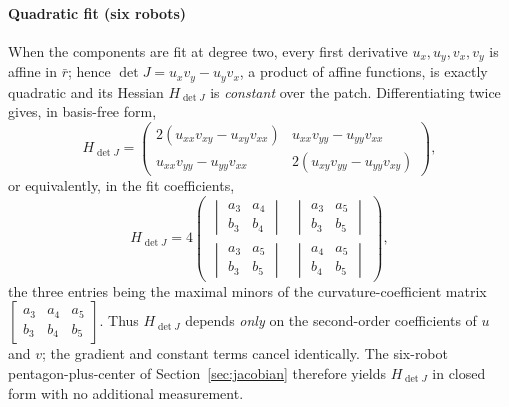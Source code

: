 \documentclass[journal]{IEEEtran}
\begin{document}
\paragraph{Quadratic fit (six robots)}
When the components are fit at degree two, every first derivative
$u_{x},u_{y},v_{x},v_{y}$ is affine in $\bar r$; hence
$\det J=u_{x}v_{y}-u_{y}v_{x}$, a product of affine functions, is exactly
quadratic and its Hessian $H_{\det J}$ is \emph{constant} over the patch.
Differentiating twice gives, in basis-free form,
\begin{equation}
\label{eq:detHquad}
H_{\det J}=
\begin{pmatrix}
2\!\left(u_{xx}v_{xy}-u_{xy}v_{xx}\right) & u_{xx}v_{yy}-u_{yy}v_{xx}\\[3pt]
u_{xx}v_{yy}-u_{yy}v_{xx} & 2\!\left(u_{xy}v_{yy}-u_{yy}v_{xy}\right)
\end{pmatrix},
\end{equation}
or equivalently, in the fit coefficients,
\begin{equation}
\label{eq:detHminor}
H_{\det J}=4
\begin{pmatrix}
\begin{vmatrix}a_{3}&a_{4}\\ b_{3}&b_{4}\end{vmatrix} &
\begin{vmatrix}a_{3}&a_{5}\\ b_{3}&b_{5}\end{vmatrix}\\[10pt]
\begin{vmatrix}a_{3}&a_{5}\\ b_{3}&b_{5}\end{vmatrix} &
\begin{vmatrix}a_{4}&a_{5}\\ b_{4}&b_{5}\end{vmatrix}
\end{pmatrix},
\end{equation}
the three entries being the maximal minors of the curvature-coefficient matrix
$\left[\begin{smallmatrix}a_{3}&a_{4}&a_{5}\\ b_{3}&b_{4}&b_{5}\end{smallmatrix}\right]$.
Thus $H_{\det J}$ depends \emph{only} on the second-order coefficients of $u$ and
$v$; the gradient and constant terms cancel identically. The six-robot
pentagon-plus-center of Section~\ref{sec:jacobian} therefore yields $H_{\det J}$ in
closed form with no additional measurement.
\end{document}
